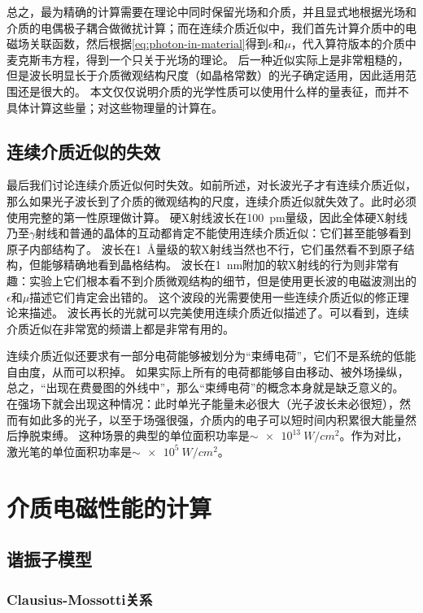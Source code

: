总之，最为精确的计算需要在理论中同时保留光场和介质，并且显式地根据光场和介质的电偶极子耦合做微扰计算；而在连续介质近似中，我们首先计算介质中的电磁场关联函数，然后根据\eqref{eq:photon-in-material}得到$\epsilon$和$\mu$，代入算符版本的介质中麦克斯韦方程，得到一个只关于光场的理论。
后一种近似实际上是非常粗糙的，但是波长明显长于介质微观结构尺度（如晶格常数）的光子确定适用，因此适用范围还是很大的。
本文仅仅说明介质的光学性质可以使用什么样的量表征，而并不具体计算这些量；对这些物理量的计算在。

\subsection{连续介质近似的失效}

最后我们讨论连续介质近似何时失效。如前所述，对长波光子才有连续介质近似，那么如果光子波长到了介质的微观结构的尺度，连续介质近似就失效了。此时必须使用完整的第一性原理做计算。
硬X射线波长在\SI{100}{pm}量级，因此全体硬X射线乃至$\gamma$射线和普通的晶体的互动都肯定不能使用连续介质近似：它们甚至能够看到原子内部结构了。
波长在\SI{1}{\angstrom}量级的软X射线当然也不行，它们虽然看不到原子结构，但能够精确地看到晶格结构。
波长在\SI{1}{nm}附加的软X射线的行为则非常有趣：实验上它们根本看不到介质微观结构的细节，但是使用更长波的电磁波测出的$\epsilon$和$\mu$描述它们肯定会出错的。
这个波段的光需要使用一些连续介质近似的修正理论来描述。
波长再长的光就可以完美使用连续介质近似描述了。可以看到，连续介质近似在非常宽的频谱上都是非常有用的。

连续介质近似还要求有一部分电荷能够被划分为“束缚电荷”，它们不是系统的低能自由度，从而可以积掉。
如果实际上所有的电荷都能够自由移动、被外场操纵，总之，“出现在费曼图的外线中”，那么“束缚电荷”的概念本身就是缺乏意义的。
在强场下就会出现这种情况：此时单光子能量未必很大（光子波长未必很短），然而有如此多的光子，以至于场强很强，介质内的电子可以短时间内积累很大能量然后挣脱束缚。
这种场景的典型的单位面积功率是$\sim\SI{e13}{W/cm^2}$。作为对比，激光笔的单位面积功率是$\sim \SI{e5}{W/cm^2}$。

\section{介质电磁性能的计算}

\subsection{谐振子模型}

\subsubsection{Clausius-Mossotti关系}

